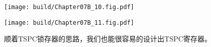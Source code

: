 \begin{Figure}[分叉输出锁存器]
    \begin{FigureSub}[正分叉输出锁存器]
        \texttt{[image: build/Chapter07B\_10.fig.pdf]}
    \end{FigureSub}
    \hspace{0.25cm}
    \begin{FigureSub}[负分叉输出相锁存器]
        \texttt{[image: build/Chapter07B\_11.fig.pdf]}
    \end{FigureSub}
\end{Figure}

顺着TSPC锁存器的思路，我们也能很容易的设计出TSPC寄存器。